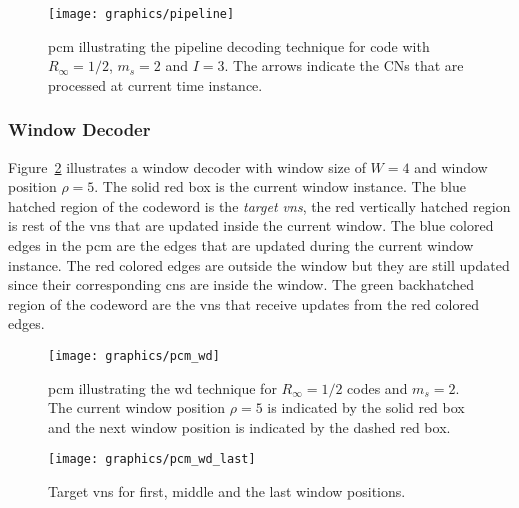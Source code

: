\begin{figure}[htbp]
  \centering
  \texttt{[image: graphics/pipeline]}
  \caption{\gls{pcm} illustrating the pipeline decoding technique for code with $R_\infty=1/2$, $m_s=2$ and $I=3$. The arrows indicate the CNs that are processed at current time instance.}
  \label{fig:pipeline}
\end{figure}

\subsubsection{Window Decoder}\label{sec:back_wd}
Figure~\ref{fig:wd} illustrates a window decoder with window size of $W=4$ and window position $\rho=5$. The solid red box is the current window instance. The blue hatched region of the codeword is the \emph{target \glspl{vn}}, the red vertically hatched region is rest of the \glspl{vn} that are updated inside the current window. The blue colored edges in the \gls{pcm} are the edges that are updated during the current window instance. The red colored edges are outside the window but they are still updated since their corresponding \glspl{cn} are inside the window. The green backhatched region of the codeword are the \glspl{vn} that receive updates from the red colored edges.
\begin{figure}[htbp]
  \centering
  \texttt{[image: graphics/pcm\_wd]}
  \caption{\gls{pcm} illustrating the \acrlong{wd} technique for $R_\infty=1/2$ codes and $m_s=2$. The current window position $\rho=5$ is indicated by the solid red box and the next window position is indicated by the dashed red box.}
  \label{fig:wd}
\end{figure}

\begin{figure}[htbp]
  \centering
  \texttt{[image: graphics/pcm\_wd\_last]}
  \caption{Target \glspl{vn} for first, middle and the last window positions.}
  \label{fig:wd_last}
\end{figure} 

